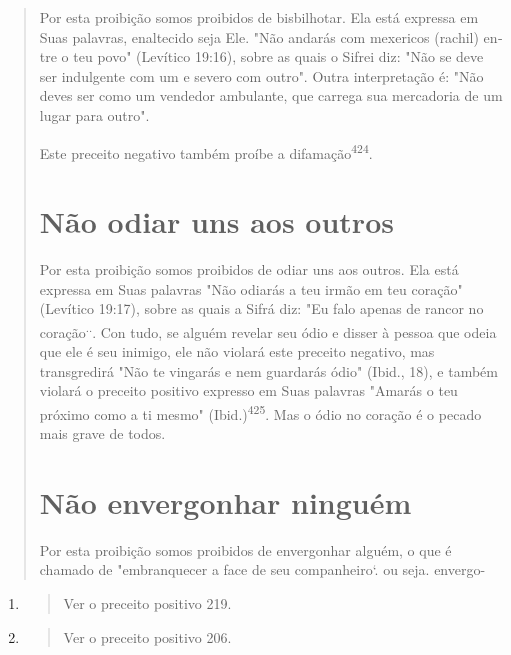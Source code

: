 \begin{quote}
Por esta proibição somos proibidos de bisbilhotar. Ela está expressa em
Suas palavras, enaltecido seja Ele. "Não andarás com mexericos (rachil)
en­tre o teu povo" (Levítico 19:16), sobre as quais o Sifrei diz: "Não
se deve ser indulgente com um e severo com outro". Outra interpretação
é: "Não deves ser como um vendedor ambulante, que carrega sua mercadoria
de um lugar pa­ra outro".

Este preceito negativo também proíbe a difamação\textsuperscript{424}.

\section{Não odiar uns aos outros}

Por esta proibição somos proibidos de odiar uns aos outros. Ela está
expressa em Suas palavras "Não odiarás a teu irmão em teu coração"
(Levítico 19:17), sobre as quais a Sifrá diz: "Eu falo apenas de rancor
no coração\textsuperscript{..}. Con tudo, se alguém revelar seu ódio e
disser à pessoa que odeia que ele é seu inimi­go, ele não violará este
preceito negativo, mas transgredirá "Não te vingarás e nem guardarás
ódio" (Ibid., 18), e também violará o preceito positivo expres­so em
Suas palavras "Amarás o teu próximo como a ti mesmo"
(Ibid.)\textsuperscript{425}. Mas o ódio no coração é o pecado mais
grave de todos.

\section{Não envergonhar ninguém}

Por esta proibição somos proibidos de envergonhar alguém, o que é
chamado de "embranquecer a face de seu companheiro`. ou seja. envergo-
\end{quote}

\begin{enumerate}
\def\labelenumi{\arabic{enumi}.}
\setcounter{enumi}{423}
\item
 \begin{quote}
 Ver o preceito positivo 219.
 \end{quote}
\item
 \begin{quote}
 Ver o preceito positivo 206.
 \end{quote}
\end{enumerate}

